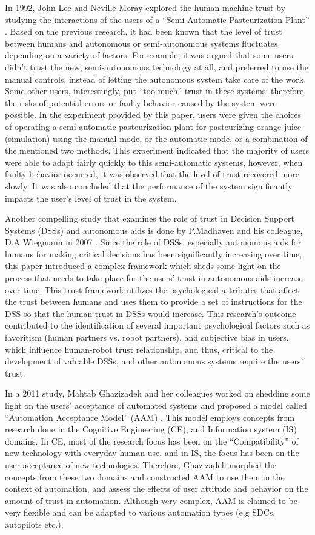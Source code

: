\documentclass[runningheads,a4paper]{llncs}
\begin{document}
In 1992, John Lee and Neville Moray explored the human-machine trust by studying the interactions of the users of a ``Semi-Automatic Pasteurization Plant'' \cite{lee1992trust}. Based on the previous research, it had been known that the level of trust between humans and autonomous or semi-autonomous systems fluctuates depending on a variety of factors. For example, if was argued that some users didn't trust the new, semi-autonomous technology at all, and preferred to use the manual controls, instead of letting the autonomous system take care of the work. Some other users, interestingly, put ``too much'' trust in these systems; therefore, the risks of potential errors or faulty behavior caused by the system were possible. In the experiment provided by this paper, users were given the choices of operating a semi-automatic pasteurization plant for pasteurizing orange juice (simulation) using the manual mode, or the automatic-mode, or a combination of the mentioned two methods. This experiment indicated that the majority of users were able to adapt fairly quickly to this semi-automatic systems, however, when faulty behavior occurred, it was observed that the level of trust recovered more slowly. It was also concluded that the performance of the system significantly impacts the user's level of trust in the system.

Another compelling study that examines the role of trust in Decision Support Systems (DSSs) and autonomous aids is done by P.Madhaven and his colleague, D.A Wiegmann in 2007 \cite{madhavan2007similarities}. Since the role of DSSs, especially autonomous aids for humans for making critical decisions has been significantly increasing over time, this paper introduced a complex framework which sheds some light on the process that needs to take place for the users' trust in autonomous aids increase over time. This trust framework utilizes the psychological attributes that affect the trust between humans and uses them to provide a set of instructions for the DSS so that the human trust in DSSs would increase. This research's outcome contributed to the identification of several important psychological factors such as favoritism (human partners vs. robot partners), and subjective bias in users, which influence human-robot trust relationship, and thus, critical to the development of valuable DSSs, and other autonomous systems require the users' trust.

In a 2011 study, Mahtab Ghazizadeh and her colleagues worked on shedding some light on the users' acceptance of automated systems and proposed a model called ``Automation Acceptance Model'' (AAM) \cite{ghazizadeh2012extending}. This model employs concepts from research done in the Cognitive Engineering (CE), and Information system (IS) domains. In CE, most of the research focus has been on the ``Compatibility'' of new technology with everyday human use, and in IS, the focus has been on the user acceptance of new technologies. Therefore, Ghazizadeh morphed the concepts from these two domains and constructed AAM to use them in the context of automation, and assess the effects of user attitude and behavior on the amount of trust in automation. Although very complex, AAM is claimed to be very flexible and can be adapted to various automation types (e.g SDCs, autopilots etc.).
\end{document}
